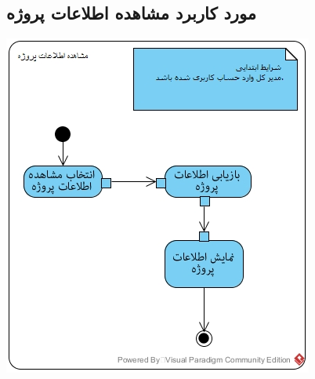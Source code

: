 \subsection*{مورد کاربرد مشاهده اطلاعات پروژه}
\vspace{2cm}
\begin{center}
\includegraphics[width=\textwidth]{ActivityDiagrams/31.jpg}
\end{center}
\newpage
\vspace{2cm}

